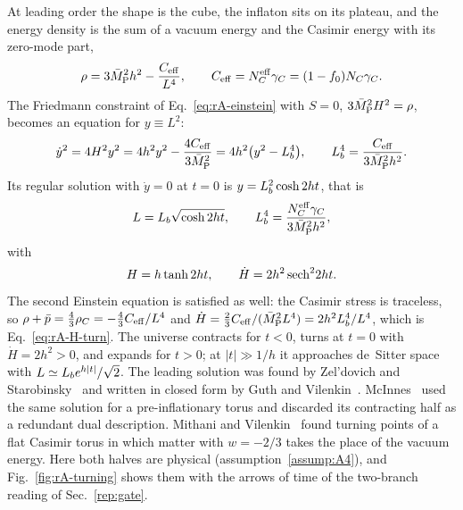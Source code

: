 At leading order the shape is the cube, the inflaton sits on its plateau, and the energy density is the sum of a vacuum energy and the Casimir energy with its zero-mode part,
\begin{equation}
\rho=3\bar M_{\mathrm{P}}^2h^2-\frac{C_{\rm eff}}{L^4},\qquad C_{\rm eff}=N_C^{\mathrm{eff}}\gamma_C=(1-f_0)N_C\gamma_C .
\label{eq:rA-rho-turn}
\end{equation}
The Friedmann constraint of Eq.~\eqref{eq:rA-einstein} with $S=0$, $3\bar M_{\mathrm{P}}^2H^2=\rho$, becomes an equation for $y\equiv L^2$:
\begin{equation}
\dot y^2=4H^2y^2=4h^2y^2-\frac{4C_{\rm eff}}{3\bar M_{\mathrm{P}}^2}=4h^2\big(y^2-L_b^4\big),\qquad L_b^4=\frac{C_{\rm eff}}{3\bar M_{\mathrm{P}}^2h^2}.
\end{equation}
Its regular solution with $\dot y=0$ at $t=0$ is $y=L_b^2\cosh2ht$, that is~\cite{Zeldovich:1984vk,Guth:2025dal}
\begin{equation}
L=L_b\sqrt{\cosh2ht},\qquad L_b^4=\frac{N_C^{\mathrm{eff}}\gamma_C}{3\bar M_{\mathrm{P}}^2h^2},
\label{eq:rA-turning-solution}
\end{equation}
with
\begin{equation}
H=h\tanh2ht,\qquad \dot H=2h^2\,{\rm sech}^22ht .
\label{eq:rA-H-turn}
\end{equation}
The second Einstein equation is satisfied as well: the Casimir stress is traceless, so $\rho+\bar p=\tfrac43\rho_C=-\tfrac43C_{\rm eff}/L^4$ and $\dot H=\tfrac23C_{\rm eff}/(\bar M_{\mathrm{P}}^2L^4)=2h^2L_b^4/L^4$, which is Eq.~\eqref{eq:rA-H-turn}.
The universe contracts for $t<0$, turns at $t=0$ with $\dot H=2h^2>0$, and expands for $t>0$; at $|t|\gg1/h$ it approaches de~Sitter space with $L\simeq L_b e^{h|t|}/\sqrt2$.
The leading solution was found by Zel'dovich and Starobinsky~\cite{Zeldovich:1984vk} and written in closed form by Guth and Vilenkin~\cite{Guth:2025dal}.
McInnes~\cite{McInnes:2005sa} used the same solution for a pre-inflationary torus and discarded its contracting half as a redundant dual description.
Mithani and Vilenkin~\cite{Mithani:2014toa} found turning points of a flat Casimir torus in which matter with $w=-2/3$ takes the place of the vacuum energy.
Here both halves are physical (assumption~\ref{assump:A4}), and Fig.~\ref{fig:rA-turning} shows them with the arrows of time of the two-branch reading of Sec.~\ref{rep:gate}.

